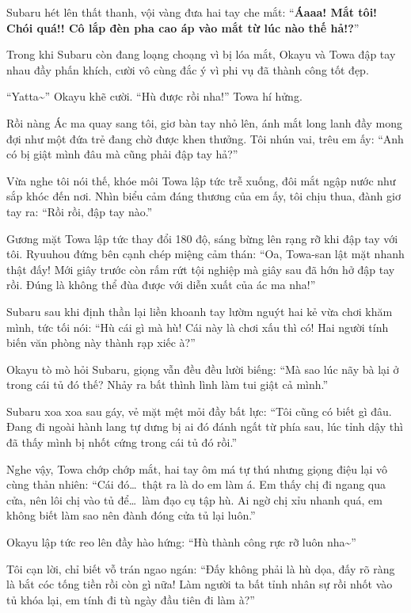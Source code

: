 \documentclass[../main.tex]{subfiles}
\begin{document}

Subaru hét lên thất thanh, vội vàng đưa hai tay che mắt: ``\textbf{Áaaa! Mắt tôi! Chói quá!! Cô lắp đèn pha cao áp vào mắt từ lúc nào thế hả!?}''

Trong khi Subaru còn đang loạng choạng vì bị lóa mắt, Okayu và Towa đập tay nhau đầy phấn khích, cười vô cùng đắc ý vì phi vụ đã thành công tốt đẹp.

``Yatta\~{}'' Okayu khẽ cười.
``Hù được rồi nha!'' Towa hí hửng.

Rồi nàng Ác ma quay sang tôi, giơ bàn tay nhỏ lên, ánh mắt long lanh đầy mong đợi như một đứa trẻ đang chờ được khen thưởng. Tôi nhún vai, trêu em ấy: ``Anh có bị giật mình đâu mà cũng phải đập tay hả?''

Vừa nghe tôi nói thế, khóe môi Towa lập tức trễ xuống, đôi mắt ngập nước như sắp khóc đến nơi. Nhìn biểu cảm đáng thương của em ấy, tôi chịu thua, đành giơ tay ra: ``Rồi rồi, đập tay nào.''

Gương mặt Towa lập tức thay đổi 180 độ, sáng bừng lên rạng rỡ khi đập tay với tôi. Ryuuhou đứng bên cạnh chép miệng cảm thán: ``Oa, Towa-san lật mặt nhanh thật đấy! Mới giây trước còn rấm rứt tội nghiệp mà giây sau đã hớn hở đập tay rồi. Đúng là không thể đùa được với diễn xuất của ác ma nha!''


Subaru sau khi định thần lại liền khoanh tay lườm nguýt hai kẻ vừa chơi khăm mình, tức tối nói: ``Hù cái gì mà hù! Cái này là chơi xấu thì có! Hai người tính biến văn phòng này thành rạp xiếc à?''

Okayu tò mò hỏi Subaru, giọng vẫn đều đều lười biếng: ``Mà sao lúc nãy bà lại ở trong cái tủ đó thế? Nhảy ra bất thình lình làm tui giật cả mình.''

Subaru xoa xoa sau gáy, vẻ mặt mệt mỏi đầy bất lực: ``Tôi cũng có biết gì đâu. Đang đi ngoài hành lang tự dưng bị ai đó đánh ngất từ phía sau, lúc tỉnh dậy thì đã thấy mình bị nhốt cứng trong cái tủ đó rồi.''

Nghe vậy, Towa chớp chớp mắt, hai tay ôm má tự thú nhưng giọng điệu lại vô cùng thản nhiên: ``Cái đó\dots\ thật ra là do em làm á. Em thấy chị đi ngang qua cửa, nên lôi chị vào tủ để\dots\ làm đạo cụ tập hù. Ai ngờ chị xỉu nhanh quá, em không biết làm sao nên đành đóng cửa tủ lại luôn.''

Okayu lập tức reo lên đầy hào hứng: ``Hù thành công rực rỡ luôn nha\~{}''


Tôi cạn lời, chỉ biết vỗ trán ngao ngán: ``Đấy không phải là hù dọa, đấy rõ ràng là bắt cóc tống tiền rồi còn gì nữa! Làm người ta bất tỉnh nhân sự rồi nhốt vào tủ khóa lại, em tính đi tù ngày đầu tiên đi làm à?''
\end{document}
